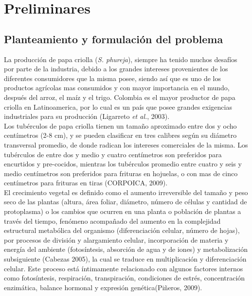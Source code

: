 \chapter{Preliminares}

\section{Planteamiento y formulación del problema}

La producción de papa criolla (\textit{S. phureja}), siempre ha tenido muchos desafíos por parte de la industria, debido a los grandes intereses provenientes de los diferentes consumidores que la misma posee, siendo así que es uno de los productos agr\'icolas mas consumidos y con mayor importancia en el mundo, después del arroz, el ma\'iz y el trigo. Colombia es el mayor productor de papa criolla en Latinoamerica, por lo cual es un pa\'is que posee grandes exigencias industriales para su producción (Ligarreto \textit{et al.}, 2003).\\

Los tubérculos de papa criolla tienen un tamaño aproximado entre dos y ocho centímetros (2-8 cm), y se pueden clasificar en tres calibres según su diámetro transversal promedio,  de donde radican los intereses comerciales de la misma. Los tubérculos de entre dos y medio y cuatro centímetros son preferidos para encurtidos y pre-cocidos, mientras los tubérculos promedio entre cuatro y seis y medio centímetros son preferidos para frituras en hojuelas, o con mas de cinco centímetros para frituras en tiras (CORPOICA, 2009).\\

El crecimiento vegetal es definido  como el aumento irreversible del tamaño y peso seco de las plantas (altura, área foliar, diámetro, número de células y cantidad de protoplasma) o los cambios que ocurren en una planta o población de plantas a través del tiempo, fenómeno acompañado del aumento en la complejidad estructural metabólica del organismo (diferenciación celular, número de hojas), por procesos de división y alargamiento celular, incorporación de materia y energía del ambiente (fotosíntesis, absorción de agua y de iones) y metabolización subsiguiente (Cabezas 2005), la cual se traduce en multiplicación y diferenciación celular. Este proceso está íntimamente relacionado con algunos factores internos como fotosíntesis, respiración, transpiración, condiciones de estrés, concentración enzimática, balance hormonal y expresión genética(Piñeros, 2009).\\

